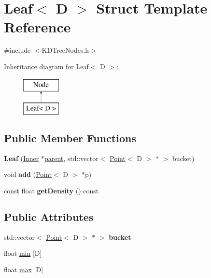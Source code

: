 \hypertarget{structLeaf}{\section{Leaf$<$ D $>$ Struct Template Reference}
\label{structLeaf}
}


{\ttfamily \#include $<$K\-D\-Tree\-Nodes.\-h$>$}

Inheritance diagram for Leaf$<$ D $>$\-:\begin{figure}[H]
\begin{center}
\leavevmode
\includegraphics[height=2.000000cm]{structLeaf}
\end{center}
\end{figure}
\subsection*{Public Member Functions}
\begin{DoxyCompactItemize}
\item 
\hypertarget{structLeaf_a7879103978bc5ac644f77baa0f894d8d}{{\bfseries Leaf} (\hyperlink{structInner}{Inner} $\ast$\hyperlink{structNode_a44c2ed507b369efa2c74549d9b862c9b}{parent}, std\-::vector$<$ \hyperlink{structPoint}{Point}$<$ D $>$ $\ast$ $>$ bucket)}\label{structLeaf_a7879103978bc5ac644f77baa0f894d8d}

\item 
\hypertarget{structLeaf_a7ef85a66171c382f0a71e91dd6c20a6a}{void {\bfseries add} (\hyperlink{structPoint}{Point}$<$ D $>$ $\ast$p)}\label{structLeaf_a7ef85a66171c382f0a71e91dd6c20a6a}

\item 
\hypertarget{structLeaf_aedd76500b8f7a50cf15a09c0a891cbbb}{const float {\bfseries get\-Density} () const }\label{structLeaf_aedd76500b8f7a50cf15a09c0a891cbbb}

\end{DoxyCompactItemize}
\subsection*{Public Attributes}
\begin{DoxyCompactItemize}
\item 
\hypertarget{structLeaf_a610b88e687cb1a1811745c9a7c826440}{std\-::vector$<$ \hyperlink{structPoint}{Point}$<$ D $>$ $\ast$ $>$ {\bfseries bucket}}\label{structLeaf_a610b88e687cb1a1811745c9a7c826440}

\item 
float \hyperlink{structLeaf_a2f9a72a5b65b46055f9cddfe01a9fd7b}{min} \mbox{[}D\mbox{]}
\item 
float \hyperlink{structLeaf_a2faeb5ae03f072a79ccb41583f736e0c}{max} \mbox{[}D\mbox{]}
\end{DoxyCompactItemize}

